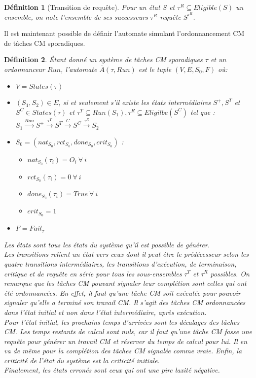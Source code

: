 \documentclass[12pt,a4paper,oneside]{book}
\theoremstyle{break}
\newtheorem{defin}{Définition}[chapter]
\theoremstyle{breakplain}
\begin{document}
\begin{defin}[Transition de requête]
Pour un état $S$ et $\tau^R \subseteq Eligible(S)$ un ensemble, on note l'ensemble de ses \textit{successeurs-$\tau^R$-requête} $S^{\tau^R}$.
\end{defin}

Il est maintenant possible de définir l'automate simulant l'ordonnancement CM de tâches CM sporadiques.\\

\begin{defin} 
\label{spo:auto}
Étant donné un système de tâches CM sporadiques $\tau$ et un ordonnanceur $Run$, l'automate $\overline{A}(\tau,Run)$ est le tuple $(V, E, S_0, F)$ où:
\begin{itemize}
\item  $V=States(\tau)$
\item $(S_1,S_2) \in E$, si et seulement s'il existe les états intermédiaires $S^{+}, S^{T}$ et $S^{C} \in States(\tau)$ et $\tau^T \subseteq Run(S_1),\tau^R \subseteq Eligilbe(S^{C}) $ tel que : \\$S_1\xrightarrow{Run}S^{+}\xrightarrow{\tau^T}S^{T}\xrightarrow{C}S^{C}\xrightarrow{\tau^R}S_2$
\item $S_0 = (nat_{S_0}, rct_{S_0}, done_{S_0}, crit_{S_0})$ :\begin{itemize}
\item $nat_{S_0}(\tau_i) = O_i\ \forall\ i$
\item $rct_{S_0}(\tau_i) = 0\ \forall\ i$
\item $done_{S_0}(\tau_i) = True\ \forall\ i$
\item $crit_{S_0} = 1$
\end{itemize}
\item $F = Fail_\tau$
\end{itemize}

Les états sont tous les états du système qu'il est possible de générer.\\

Les transitions relient un état vers ceux dont il peut être le prédécesseur selon les quatre transitions intermédiaires, les transitions d'exécution, de terminaison, critique et de requête en série pour tous les sous-ensembles $\tau^T$ et $\tau^R$ possibles. On remarque que les tâches CM pouvant signaler leur complétion sont celles qui ont été ordonnancées. En effet, il faut qu'une tâche CM soit exécutée pour pouvoir signaler qu'elle a terminé son travail CM. Il s'agit des tâches CM ordonnancées dans l'état initial et non dans l'état intermédiaire, après exécution.\\

Pour l'état initial, les prochains temps d'arrivées sont les décalages des tâches CM. Les temps restants de calcul sont nuls, car il faut qu'une tâche CM fasse une requête pour générer un travail CM et réserver du temps de calcul pour lui. Il en va de même pour la complétion des tâches CM signalée comme vraie. Enfin, la criticité de l'état du système est la criticité initiale.\\

Finalement, les états erronés sont ceux qui ont une pire laxité négative.\\
\end{defin} 
\end{document}
